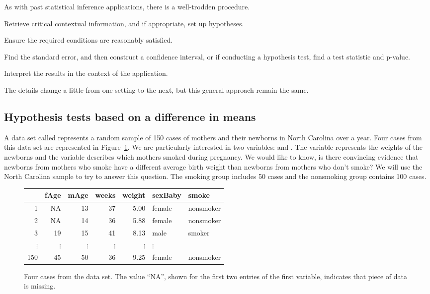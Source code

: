 
\noindent%
As with past statistical inference applications,
there is a well-trodden procedure.
\begin{description}
\setlength{\itemsep}{0mm}
\item[Prepare.]
    Retrieve critical contextual information,
    and if appropriate, set up hypotheses.
\item[Check.]
    Ensure the required conditions are reasonably
    satisfied.
\item[Calculate.]
    Find the standard error, and then construct
    a confidence interval, or if conducting
    a hypothesis test, find a test statistic
    and p-value.
\item[Conclude.]
    Interpret the results in the context of the
    application.
\end{description}
The details change a little from one setting to the next,
but this general approach remain the same.



\subsection{Hypothesis tests based on a difference in means}


A data set called  represents a random sample of 150 cases of mothers and their newborns in North Carolina over a year. Four cases from this data set are represented in Figure~\ref{babySmokeDF}. We are particularly interested in two variables:  and . The  variable represents the weights of the newborns and the  variable describes which mothers smoked during pregnancy. We would like to know, is there convincing evidence that newborns from mothers who smoke have a different average birth weight than newborns from mothers who don't smoke? We will use the North Carolina sample to try to answer this question. The smoking group includes 50 cases and the nonsmoking group contains 100 cases.

\begin{figure}[h]
\centering
\begin{tabular}{rrrrrll}
  \hline
 & fAge & mAge & weeks & weight & sexBaby & smoke \\ 
  \hline
1 & NA & 13 &  37 & 5.00 & female & nonsmoker \\ 
  2 & NA & 14 &  36 & 5.88 & female & nonsmoker \\ 
  3 & 19 & 15 &  41 & 8.13 & male & smoker \\ 
  $\vdots$ &   $\vdots$ &   $\vdots$ &   $\vdots$ &   $\vdots$ &   $\vdots$ \\
  150 & 45 & 50 &  36 & 9.25 & female & nonsmoker \\ 
   \hline
\end{tabular}
\caption{Four cases from the  data set. The value ``NA'', shown for the first two entries of the first variable, indicates that piece of data is missing.}
\label{babySmokeDF}
\end{figure}


